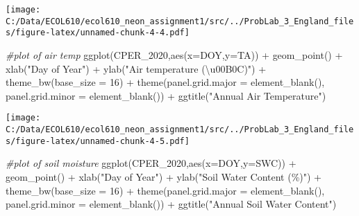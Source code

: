 \documentclass[
]{article}
\newenvironment{Shaded}{\begin{snugshade}}{\end{snugshade}}
\newcommand{\AttributeTok}[1]{\textcolor[rgb]{0.77,0.63,0.00}{#1}}
\newcommand{\CommentTok}[1]{\textcolor[rgb]{0.56,0.35,0.01}{\textit{#1}}}
\newcommand{\DecValTok}[1]{\textcolor[rgb]{0.00,0.00,0.81}{#1}}
\newcommand{\FunctionTok}[1]{\textcolor[rgb]{0.00,0.00,0.00}{#1}}
\newcommand{\NormalTok}[1]{#1}
\newcommand{\SpecialCharTok}[1]{\textcolor[rgb]{0.00,0.00,0.00}{#1}}
\newcommand{\StringTok}[1]{\textcolor[rgb]{0.31,0.60,0.02}{#1}}
\begin{document}
\texttt{[image: C:/Data/ECOL610/ecol610\_neon\_assignment1/src/../ProbLab\_3\_England\_files/figure-latex/unnamed-chunk-4-4.pdf]}

\begin{Shaded}
\begin{Highlighting}[]
\CommentTok{\#plot of air temp}
\FunctionTok{ggplot}\NormalTok{(CPER\_2020,}\FunctionTok{aes}\NormalTok{(}\AttributeTok{x=}\NormalTok{DOY,}\AttributeTok{y=}\NormalTok{TA)) }\SpecialCharTok{+} \FunctionTok{geom\_point}\NormalTok{() }\SpecialCharTok{+} 
    \FunctionTok{xlab}\NormalTok{(}\StringTok{"Day of Year"}\NormalTok{) }\SpecialCharTok{+} 
    \FunctionTok{ylab}\NormalTok{(}\StringTok{"Air temperature (\textbackslash{}u00B0C)"}\NormalTok{) }\SpecialCharTok{+}
    \FunctionTok{theme\_bw}\NormalTok{(}\AttributeTok{base\_size =} \DecValTok{16}\NormalTok{) }\SpecialCharTok{+} \FunctionTok{theme}\NormalTok{(}\AttributeTok{panel.grid.major =} \FunctionTok{element\_blank}\NormalTok{(), }\AttributeTok{panel.grid.minor =} \FunctionTok{element\_blank}\NormalTok{()) }\SpecialCharTok{+} \FunctionTok{ggtitle}\NormalTok{(}\StringTok{"Annual Air Temperature"}\NormalTok{)}
\end{Highlighting}
\end{Shaded}

\texttt{[image: C:/Data/ECOL610/ecol610\_neon\_assignment1/src/../ProbLab\_3\_England\_files/figure-latex/unnamed-chunk-4-5.pdf]}

\begin{Shaded}
\begin{Highlighting}[]
\CommentTok{\#plot of soil moisture}
\FunctionTok{ggplot}\NormalTok{(CPER\_2020,}\FunctionTok{aes}\NormalTok{(}\AttributeTok{x=}\NormalTok{DOY,}\AttributeTok{y=}\NormalTok{SWC)) }\SpecialCharTok{+} \FunctionTok{geom\_point}\NormalTok{() }\SpecialCharTok{+} 
    \FunctionTok{xlab}\NormalTok{(}\StringTok{"Day of Year"}\NormalTok{) }\SpecialCharTok{+} 
    \FunctionTok{ylab}\NormalTok{(}\StringTok{"Soil Water Content (\%)"}\NormalTok{) }\SpecialCharTok{+}
    \FunctionTok{theme\_bw}\NormalTok{(}\AttributeTok{base\_size =} \DecValTok{16}\NormalTok{) }\SpecialCharTok{+} \FunctionTok{theme}\NormalTok{(}\AttributeTok{panel.grid.major =} \FunctionTok{element\_blank}\NormalTok{(), }\AttributeTok{panel.grid.minor =} \FunctionTok{element\_blank}\NormalTok{()) }\SpecialCharTok{+} \FunctionTok{ggtitle}\NormalTok{(}\StringTok{"Annual Soil Water Content"}\NormalTok{)}
\end{Highlighting}
\end{Shaded}
\end{document}
